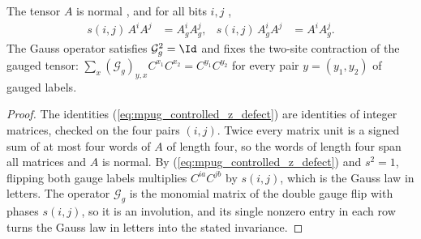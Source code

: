 \begin{lemma}
    \label{thm:mpug_controlled_z_gauss_law}
    \leanok
    The tensor $A$ is normal \cite[line~3885]{FrancoRubio2025MPUGauging}, and
    for all bits $i,j$ \cite[eq.~(Z2\_def)]{FrancoRubio2025MPUGauging},
    \begin{align}
        s(i,j)\,A^iA^j   & =A_g^iA_g^j, &
        s(i,j)\,A_g^iA^j & =A^iA_g^j.
        \label{eq:mpug_controlled_z_defect}
    \end{align}
    The Gauss operator satisfies $\mathcal G_g^2=\Id$ and fixes the two-site
    contraction of the gauged tensor:
    $\sum_x(\mathcal G_g)_{y,x}C^{x_1}C^{x_2}=C^{y_1}C^{y_2}$ for every pair
    $y=(y_1,y_2)$ of gauged labels.
\end{lemma}

\begin{proof}\leanok
    The identities (\ref{eq:mpug_controlled_z_defect}) are identities of
    integer matrices, checked on the four pairs $(i,j)$. Twice every matrix
    unit is a signed sum of at most four words of $A$ of length four, so the
    words of length four span all matrices and $A$ is normal. By
    (\ref{eq:mpug_controlled_z_defect}) and $s^2=1$, flipping both gauge labels
    multiplies $C^{ia}C^{jb}$ by $s(i,j)$, which is the Gauss law in letters.
    The operator $\mathcal G_g$ is the monomial matrix of the double gauge
    flip with phases $s(i,j)$, so it is an involution, and its single nonzero
    entry in each row turns the Gauss law in letters into the stated
    invariance.
\end{proof}

